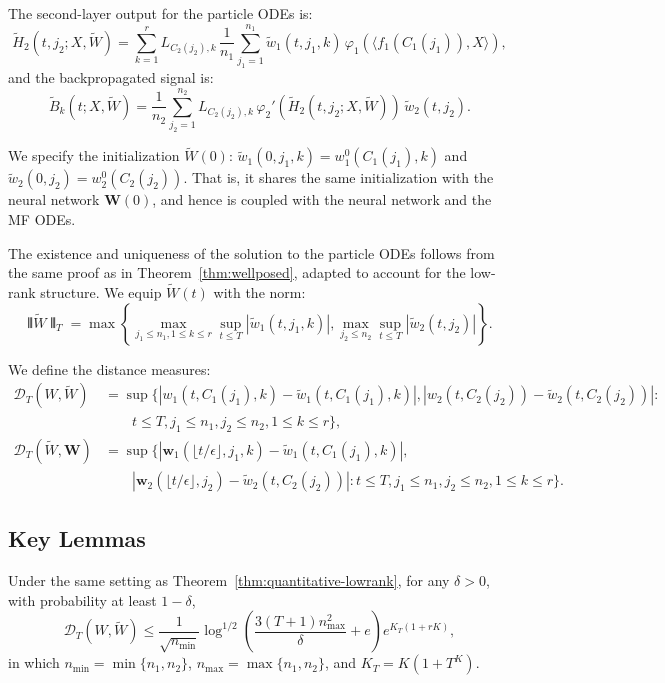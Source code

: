 The second-layer output for the particle ODEs is:
\[
\tilde{H}_2(t, j_2; X, \tilde{W}) = \sum_{k=1}^r L_{C_2(j_2),k}\,\frac{1}{n_1}\sum_{j_1=1}^{n_1} \tilde{w}_1(t, j_1, k)\,\varphi_1(\langle f_1(C_1(j_1)), X\rangle),
\]
and the backpropagated signal is:
\[
\tilde{B}_k(t; X, \tilde{W}) = \frac{1}{n_2}\sum_{j_2=1}^{n_2} L_{C_2(j_2),k}\,\varphi_2'(\tilde{H}_2(t, j_2; X, \tilde{W}))\,\tilde{w}_2(t, j_2).
\]

We specify the initialization $\tilde{W}(0)$: $\tilde{w}_1(0, j_1, k) = w_1^0(C_1(j_1), k)$ and $\tilde{w}_2(0, j_2) = w_2^0(C_2(j_2))$. That is, it shares the same initialization with the neural network $\mathbf{W}(0)$, and hence is coupled with the neural network and the MF ODEs.

The existence and uniqueness of the solution to the particle ODEs follows from the same proof as in Theorem~\ref{thm:wellposed}, adapted to account for the low-rank structure. We equip $\tilde{W}(t)$ with the norm:
\[
\interleave\tilde{W}\interleave_T = \max\left\{\max_{j_1 \le n_1, 1 \le k \le r}\sup_{t \le T}|\tilde{w}_1(t, j_1, k)|, \max_{j_2 \le n_2}\sup_{t \le T}|\tilde{w}_2(t, j_2)|\right\}.
\]

We define the distance measures:
\begin{align*}
\mathscr{D}_T(W, \tilde{W}) &= \sup\Big\{|w_1(t, C_1(j_1), k) - \tilde{w}_1(t, C_1(j_1), k)|, |w_2(t, C_2(j_2)) - \tilde{w}_2(t, C_2(j_2))|:\\
&\qquad t \le T, j_1 \le n_1, j_2 \le n_2, 1 \le k \le r\Big\},\\
\mathscr{D}_T(\tilde{W}, \mathbf{W}) &= \sup\Big\{|\mathbf{w}_1(\lfloor t/\epsilon\rfloor, j_1, k) - \tilde{w}_1(t, C_1(j_1), k)|,\\
&\qquad |\mathbf{w}_2(\lfloor t/\epsilon\rfloor, j_2) - \tilde{w}_2(t, C_2(j_2))|: t \le T, j_1 \le n_1, j_2 \le n_2, 1 \le k \le r\Big\}.
\end{align*}

\subsection{Key Lemmas}

\begin{lemma}
\label{lem:particle-lowrank}
Under the same setting as Theorem~\ref{thm:quantitative-lowrank}, for any $\delta > 0$, with probability at least $1-\delta$,
\[
\mathscr{D}_T(W, \tilde{W}) \le \frac{1}{\sqrt{n_{\min}}}\log^{1/2}\left(\frac{3(T+1)n_{\max}^2}{\delta} + e\right)e^{K_T(1+rK)},
\]
in which $n_{\min} = \min\{n_1, n_2\}$, $n_{\max} = \max\{n_1, n_2\}$, and $K_T = K(1+T^K)$.
\end{lemma}

